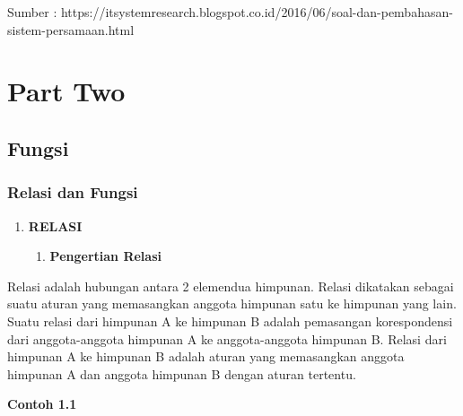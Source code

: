 \documentclass[11pt,fleqn]{book} %
\begin{document}
\begin{myEnumerate}
\begin{itemize}
\noindent Sumber : https://itsystemresearch.blogspot.co.id/2016/06/soal-dan-pembahasan-sistem-persamaan.html\textbf{}

\noindent 




\part{Part Two}



\chapter{Fungsi}

\section{Relasi dan Fungsi}

\begin{enumerate}
\item \textbf{ RELASI}

\begin{enumerate}
\item \textbf{ Pengertian Relasi}
\end{enumerate}
\end{enumerate}

\noindent 

 Relasi adalah hubungan antara 2 elemendua himpunan. Relasi dikatakan sebagai suatu aturan yang memasangkan anggota himpunan satu ke himpunan yang lain. Suatu relasi dari himpunan A ke himpunan B adalah pemasangan korespondensi dari anggota-anggota himpunan A ke anggota-anggota himpunan B. Relasi dari himpunan A ke himpunan B adalah aturan yang memasangkan anggota himpunan A dan anggota himpunan B dengan aturan tertentu.

\noindent 

\noindent \textbf{Contoh 1.1}


\end{itemize}
\end{myEnumerate}
\end{document}
